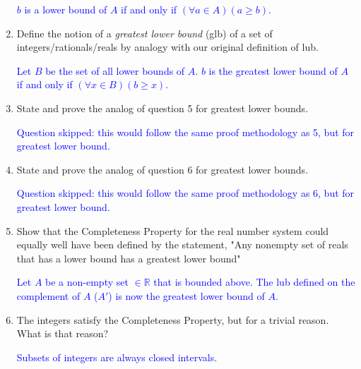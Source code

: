 \documentclass[13.5pt]{article}
\begin{document}
\begin{enumerate}
\textcolor{blue} {\(b\) is a lower bound of \(A\) if and only if \((\forall a \in A)(a\geq b)\).}

\item{Define the notion of a \textit{greatest lower bound} (glb) of a set of integers/rationals/reals by analogy with our original definition of lub.}

\textcolor{blue} {Let \(B\) be the set of all lower bounds of \(A\). \(b\) is the greatest lower bound of \(A\) if and only if \((\forall x \in B)(b\geq x)\).}

\item{State and prove the analog of question 5 for greatest lower bounds.}

\textcolor{blue}{Question skipped: this would follow the same proof methodology as 5, but for greatest lower bound.}

\item{State and prove the analog of question 6 for greatest lower bounds.}

\textcolor{blue}{Question skipped: this would follow the same proof methodology as 6, but for greatest lower bound.}

\item{Show that the Completeness Property for the real number system could equally well have been defined by the statement, "Any nonempty set of reals that has a lower bound has a greatest lower bound"}

\textcolor{blue}{Let \(A\) be a non-empty set \(\in \mathbb{R}\) that is bounded above. The lub defined on the complement of \(A\) (\(A'\)) is now the greatest lower bound of \(A\).}  

\item{The integers satisfy the Completeness Property, but for a trivial reason. What is that reason?}

\textcolor{blue}{Subsets of integers are always closed intervals.}  


\end{enumerate}
\end{document}
